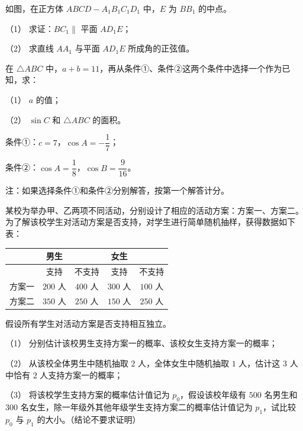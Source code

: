\Needspace{0.4\textheight}
\begin{question}
如图，在正方体 $ABCD-A_1B_1C_1D_1$ 中，$E$ 为 $BB_1$ 的中点。

（1） 求证：$BC_1\parallel$ 平面 $AD_1E$；

（2） 求直线 $AA_1$ 与平面 $AD_1E$ 所成角的正弦值。
\nopagebreak[4]
\begin{center}\end{center}
\nopagebreak[4]
\end{question}
\begin{question}
在 $\triangle ABC$ 中，$a+b=11$，再从条件①、条件②这两个条件中选择一个作为已知，求：

（1） $a$ 的值；

（2） $\sin C$ 和 $\triangle ABC$ 的面积。

条件①：$c=7$，$\cos A=-\dfrac17$；

条件②：$\cos A=\dfrac18$，$\cos B=\dfrac9{16}$。

注：如果选择条件①和条件②分别解答，按第一个解答计分。

\end{question}
\begin{question}
某校为举办甲、乙两项不同活动，分别设计了相应的活动方案：方案一、方案二。为了解该校学生对活动方案是否支持，对学生进行简单随机抽样，获得数据如下表：

\begin{center}
\begin{tabular}{ccccc}
\toprule
 & 男生 &  & 女生 &  \\
\midrule
 & 支持 & 不支持 & 支持 & 不支持 \\
方案一 & $200$ 人 & $400$ 人 & $300$ 人 & $100$ 人 \\
方案二 & $350$ 人 & $250$ 人 & $150$ 人 & $250$ 人 \\
\bottomrule
\end{tabular}
\end{center}

假设所有学生对活动方案是否支持相互独立。

（1） 分别估计该校男生支持方案一的概率、该校女生支持方案一的概率；

（2） 从该校全体男生中随机抽取 $2$ 人，全体女生中随机抽取 $1$ 人，估计这 $3$ 人中恰有 $2$ 人支持方案一的概率；

（3） 将该校学生支持方案的概率估计值记为 $p_0$，假设该校年级有 $500$ 名男生和 $300$ 名女生，除一年级外其他年级学生支持方案二的概率估计值记为 $p_1$，试比较 $p_0$ 与 $p_1$ 的大小。（结论不要求证明）

\end{question}
